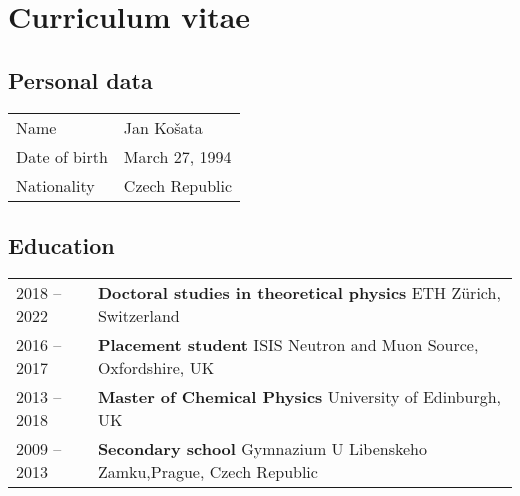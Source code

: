 

\chapter*{Curriculum vitae}

\section*{Personal data}

\begin{tabularx}{\textwidth}{p{}X}
Name 			& Jan Ko\v{s}ata \\
Date of birth 	& March 27, 1994 \\
Nationality		& Czech Republic
\end{tabularx}

\vspace{0.5cm}

\section*{Education}

\begin{tabularx}{\textwidth}{p{}X}
2018 -- 2022  & 
{\bfseries Doctoral studies in theoretical physics} \newline 
ETH Z\"urich, Switzerland \newline
\\
2016 -- 2017  & 
{\bfseries Placement student} \newline 
ISIS Neutron and Muon Source, Oxfordshire, UK \newline
\\
2013 -- 2018  & 
{\bfseries Master of Chemical Physics} \newline 
University of Edinburgh, UK \newline
\\
2009 -- 2013  & 
{\bfseries Secondary school} \newline 
Gymnazium U Libenskeho Zamku,\newline Prague, Czech Republic \newline
\end{tabularx}